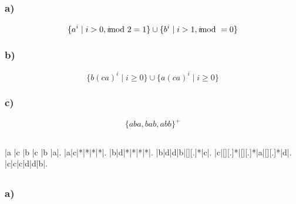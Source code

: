 \documentclass{article}
\begin{document}
   \subsection{} 
   
   \subsubsection{a)}
   
   \begin{equation*}
      \{a^i \mid i > 0, i \kern-8pt\mod 2 = 1\} \cup \{b^i \mid i > 1, i
      \kern-8pt\mod = 0\}
   \end{equation*}

   \subsubsection{b)}

   \begin{equation*}
      \{b(ca)^i \mid i \ge 0\} \cup \{a(ca)^i \mid i \ge 0\}
   \end{equation*}

   \subsubsection{c)}

   \begin{equation*}
      \{aba, bab, abb\}^+
   \end{equation*}

   \subsection{} 
   
   \def\PuzzleSolutionContent#1{\makebox(1,1){\itshape{#1}}}
   \renewcommand{\PuzzleLineThickness}{1pt}
   \PuzzleSolution
   \begin{Puzzle}{6}{6}
      |a |c |b |c |b |a|.
      |a|c|*|*|*|*|.
      |b|d|*|*|*|*|.
      |b|d|d|b|[][.]*|c|.
      |c|[][.]*|[][.]*|a|[][.]*|d|.
      |c|c|c|d|d|b|.
   \end{Puzzle}

   \subsection{} 
   
   \subsubsection{a)}
      
\end{document}
